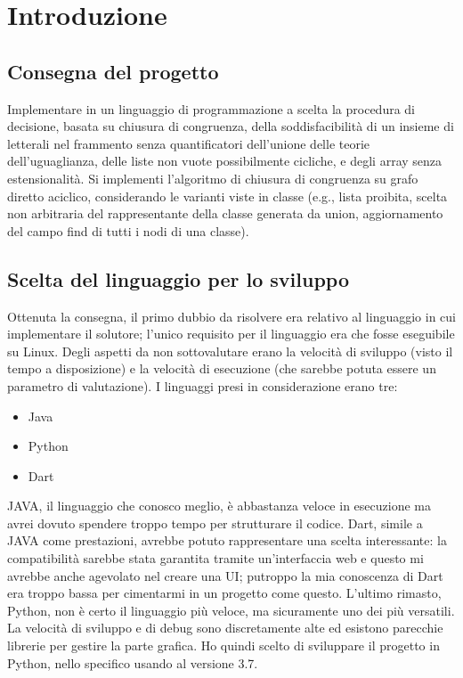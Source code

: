 \chapter{Introduzione}
\section{Consegna del progetto}
Implementare in un linguaggio di programmazione a scelta la procedura di decisione,
basata su chiusura di congruenza, della soddisfacibilità di un insieme di letterali nel
frammento senza quantificatori dell'unione delle teorie dell'uguaglianza, delle liste
non vuote possibilmente cicliche, e degli array senza estensionalità. Si implementi
l'algoritmo di chiusura di congruenza su grafo diretto aciclico, considerando le varianti
viste in classe (e.g., lista proibita, scelta non arbitraria del rappresentante della classe
generata da union, aggiornamento del campo find di tutti i nodi di una classe).
\section{Scelta del linguaggio per lo sviluppo}
Ottenuta la consegna, il primo dubbio da risolvere era relativo al linguaggio in cui implementare il solutore;
l'unico requisito per il linguaggio era che fosse eseguibile su Linux. Degli aspetti da non sottovalutare erano
la velocità di sviluppo (visto il tempo a disposizione) e la velocità di esecuzione (che sarebbe potuta essere un
parametro di valutazione). I linguaggi presi in considerazione erano tre:
\begin{itemize}
    \item Java
    \item Python
    \item Dart
\end{itemize}
JAVA, il linguaggio che conosco meglio, è abbastanza veloce in esecuzione ma avrei dovuto spendere troppo tempo per
strutturare il codice. Dart, simile a JAVA come prestazioni, avrebbe potuto rappresentare una scelta interessante: la
compatibilità sarebbe stata garantita tramite un'interfaccia web e questo mi avrebbe anche agevolato nel creare una UI;
putroppo la mia conoscenza di Dart era troppo bassa per cimentarmi in un progetto come questo. L'ultimo rimasto, Python,
non è certo il linguaggio più veloce, ma sicuramente uno dei più versatili. La velocità di sviluppo e di debug sono
discretamente alte ed esistono parecchie librerie per gestire la parte grafica. Ho quindi scelto di sviluppare il
progetto in Python, nello specifico usando al versione 3.7.

